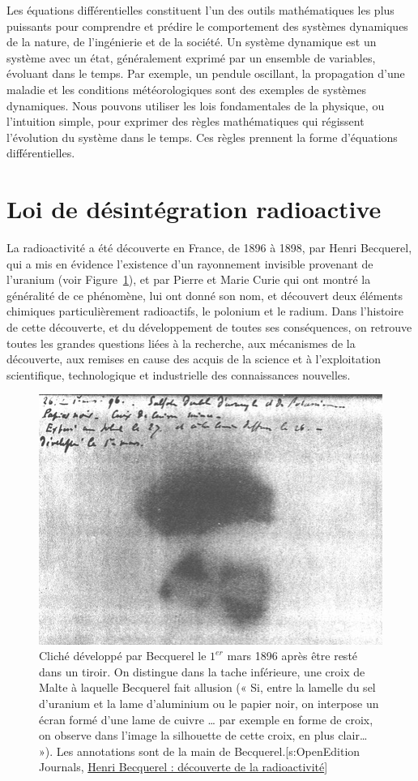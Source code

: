\documentclass[%
oneside,                 %
final,                   %
10pt]{article}
\begin{document}
Les équations différentielles constituent l'un des outils mathématiques les plus puissants pour comprendre et prédire le comportement des systèmes dynamiques de la nature, de l'ingénierie et de la société. Un système dynamique est un système avec un état, généralement exprimé par un ensemble de variables, évoluant dans le temps. Par exemple, un pendule oscillant, la propagation d'une maladie et les conditions météorologiques sont des exemples de systèmes dynamiques. Nous pouvons utiliser les lois fondamentales de la physique, ou l'intuition simple, pour exprimer des règles mathématiques qui régissent l'évolution du système dans le temps. Ces règles prennent la forme d'équations différentielles.


\section{Loi de désintégration radioactive}

La radioactivité a été découverte en France, de 1896 à 1898, par Henri Becquerel, qui a mis en évidence l’existence d’un rayonnement invisible provenant de l’uranium (voir Figure~\ref{fig:Becquerel}), et par Pierre et Marie Curie qui ont montré la généralité de ce phénomène, lui ont donné son nom, et découvert deux éléments chimiques particulièrement radioactifs, le polonium et le radium. Dans l’histoire de cette découverte, et du développement de toutes ses conséquences, on retrouve toutes les grandes questions liées à la recherche, aux mécanismes de la découverte, aux remises en cause des acquis de la science et à l’exploitation scientifique, technologique et industrielle des connaissances nouvelles.


\begin{figure}[!ht]  %
  \centerline{\includegraphics[width=0.7\linewidth]{imgs/radioactivite.jpg}}
  \caption{
  Cliché développé par Becquerel le $1^{er}$ mars 1896 après être resté dans un tiroir. On distingue dans la tache inférieure, une croix de Malte à laquelle Becquerel fait allusion (« Si, entre la lamelle du sel d’uranium et la lame d’aluminium ou le papier noir, on interpose un écran formé d’une lame de cuivre … par exemple en forme de croix, on observe dans l’image la silhouette de cette croix, en plus clair… »). Les annotations sont de la main de Becquerel.[s:OpenEdition Journals, \href{{https://journals.openedition.org/bibnum/848}}{Henri Becquerel : découverte de la radioactivité}] \label{fig:Becquerel}
  }
\end{figure}
\end{document}
